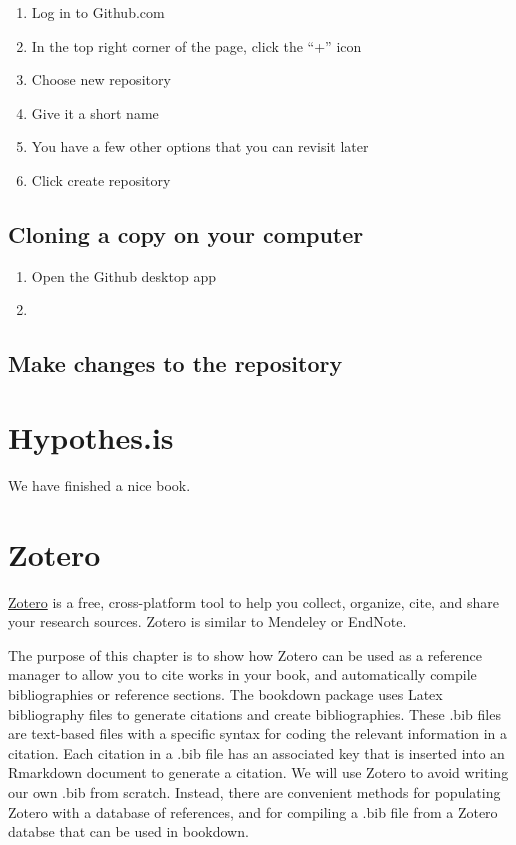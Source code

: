 \documentclass[]{book}
\providecommand{\tightlist}{%
  \setlength{\itemsep}{0pt}\setlength{\parskip}{0pt}}
\theoremstyle{definition}
\theoremstyle{definition}
\theoremstyle{definition}
\theoremstyle{remark}
\begin{document}
\begin{enumerate}
\def\labelenumi{\arabic{enumi}.}
\tightlist
\item
  Log in to Github.com
\item
  In the top right corner of the page, click the ``+'' icon
\item
  Choose new repository
\item
  Give it a short name
\item
  You have a few other options that you can revisit later
\item
  Click create repository
\end{enumerate}

\section{Cloning a copy on your
computer}\label{cloning-a-copy-on-your-computer}

\begin{enumerate}
\def\labelenumi{\arabic{enumi}.}
\item
  Open the Github desktop app
\item
\end{enumerate}

\section{Make changes to the
repository}\label{make-changes-to-the-repository}

\chapter{Hypothes.is}\label{hypothes.is-1}

We have finished a nice book.

\chapter{Zotero}\label{zotero-1}

\href{https://www.zotero.org}{Zotero} is a free, cross-platform tool to
help you collect, organize, cite, and share your research sources.
Zotero is similar to Mendeley or EndNote.

The purpose of this chapter is to show how Zotero can be used as a
reference manager to allow you to cite works in your book, and
automatically compile bibliographies or reference sections. The bookdown
package uses Latex bibliography files to generate citations and create
bibliographies. These .bib files are text-based files with a specific
syntax for coding the relevant information in a citation. Each citation
in a .bib file has an associated key that is inserted into an Rmarkdown
document to generate a citation. We will use Zotero to avoid writing our
own .bib from scratch. Instead, there are convenient methods for
populating Zotero with a database of references, and for compiling a
.bib file from a Zotero databse that can be used in bookdown.
\end{document}
